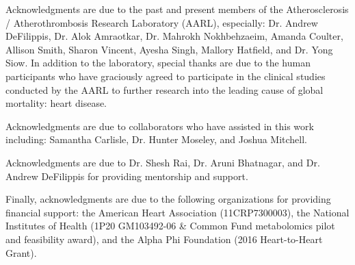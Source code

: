 \documentclass[final]{ulthesis}
\begin{document}
\begin{acknowledgments}
Acknowledgments are due to the past and present members of the Atherosclerosis / Atherothrombosis Research Laboratory (AARL), especially: Dr. Andrew DeFilippis, Dr. Alok Amraotkar, Dr. Mahrokh Nokhbehzaeim, Amanda Coulter, Allison Smith, Sharon Vincent, Ayesha Singh, Mallory Hatfield, and Dr. Yong Siow. In addition to the laboratory, special thanks are due to the human participants who have graciously agreed to participate in the clinical studies conducted by the AARL to further research into the leading cause of global mortality: heart disease.

Acknowledgments are due to collaborators who have assisted in this work including: Samantha Carlisle, Dr. Hunter Moseley, and Joshua Mitchell.

Acknowledgments are due to Dr. Shesh Rai, Dr. Aruni Bhatnagar, and Dr. Andrew DeFilippis for providing mentorship and support. 

Finally, acknowledgments are due to the following organizations for providing financial support: the American Heart Association (11CRP7300003), the National Institutes of Health
(1P20 GM103492-06 \& Common Fund metabolomics pilot and feasibility award), and the Alpha Phi Foundation (2016 Heart-to-Heart Grant).
\end{acknowledgments}
\end{document}

